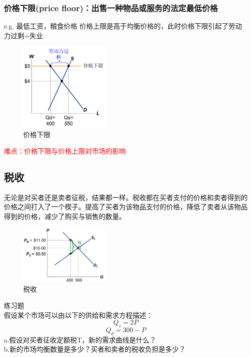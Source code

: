 \documentclass[12pt,a4paper]{article}
\begin{document}
\subsubsection{价格下限(price floor)：出售一种物品或服务的法定最低价格}
e.g. 最低工资，粮食价格
价格上限是高于均衡价格的，此时价格下限引起了劳动力过剩=失业
\begin{figure}[H] 
  \centering %
  \includegraphics[width=0.4\textwidth]{价格下限.png} 
  \caption{价格下限} %
\end{figure}

\textcolor{red}{难点：价格下限与价格上限对市场的影响}


\newpage

\subsection{税收}
无论是对买者还是卖者征税，结果都一样。税收都在买者支付的价格和卖者得到的价格之间打入了一个楔子。提高了买者为该物品支付的价格，降低了卖者从该物品得到的价格，减少了购买与销售的数量。

\begin{figure}[H] 
  \centering %
  \includegraphics[width=0.4\textwidth]{税收.png} 
  \caption{税收} %
\end{figure}

练习题\\
假设某个市场可以由以下的供给和需求方程描述：\\
\[ Q_s=2P\]
\[ Q_d=300-P\]
a.假设对买者征收定额税T，新的需求曲线是什么？\\
b.新的市场均衡数量是多少？买者和卖者的税收负担是多少？\\
\end{document}

